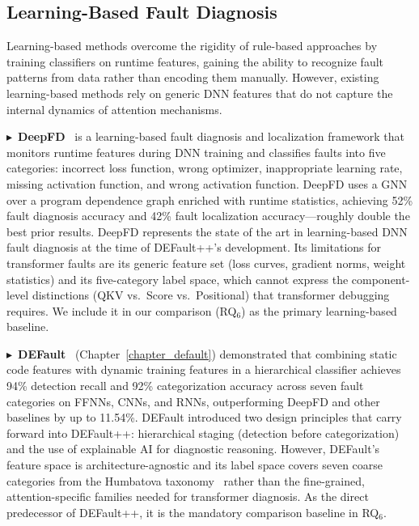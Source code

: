 \subsection{Learning-Based Fault Diagnosis}
\label{subsec:rw_learning}

Learning-based methods overcome the rigidity of rule-based approaches by training classifiers on runtime features, gaining the ability to recognize fault patterns from data rather than encoding them manually. However, existing learning-based methods rely on generic DNN features that do not capture the internal dynamics of attention mechanisms.

$\blacktriangleright$~\textbf{DeepFD}~\cite{deepfd} is a learning-based fault diagnosis and localization framework that monitors runtime features during DNN training and classifies faults into five categories: incorrect loss function, wrong optimizer, inappropriate learning rate, missing activation function, and wrong activation function. DeepFD uses a GNN over a program dependence graph enriched with runtime statistics, achieving 52\% fault diagnosis accuracy and 42\% fault localization accuracy---roughly double the best prior results. DeepFD represents the state of the art in learning-based DNN fault diagnosis at the time of DEFault++'s development. Its limitations for transformer faults are its generic feature set (loss curves, gradient norms, weight statistics) and its five-category label space, which cannot express the component-level distinctions (QKV vs.\ Score vs.\ Positional) that transformer debugging requires. We include it in our comparison (RQ$_6$) as the primary learning-based baseline.

$\blacktriangleright$~\textbf{DEFault}~\cite{default} (Chapter~\ref{chapter_default}) demonstrated that combining static code features with dynamic training features in a hierarchical classifier achieves 94\% detection recall and 92\% categorization accuracy across seven fault categories on FFNNs, CNNs, and RNNs, outperforming DeepFD and other baselines by up to 11.54\%. DEFault introduced two design principles that carry forward into DEFault++: hierarchical staging (detection before categorization) and the use of explainable AI for diagnostic reasoning. However, DEFault's feature space is architecture-agnostic and its label space covers seven coarse categories from the Humbatova taxonomy~\cite{humbatova2020taxonomy} rather than the fine-grained, attention-specific families needed for transformer diagnosis. As the direct predecessor of DEFault++, it is the mandatory comparison baseline in RQ$_6$.

